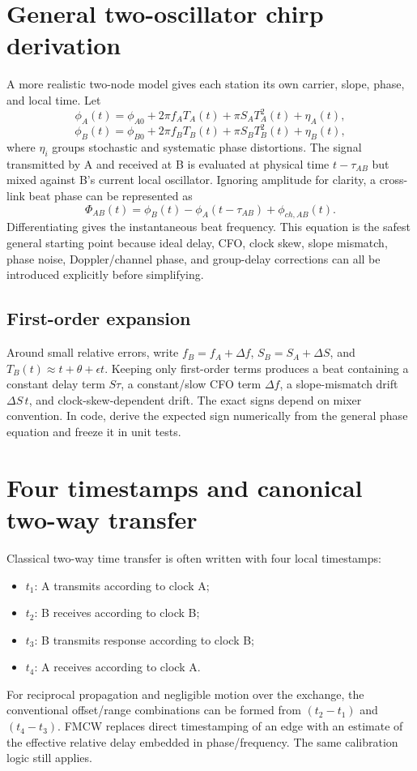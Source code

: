 \documentclass[11pt]{article}
\begin{document}
\clearpage
\section{General two-oscillator chirp derivation}
A more realistic two-node model gives each station its own carrier, slope, phase, and local time. Let
\[
\phi_A(t)=\phi_{A0}+2\pi f_A T_A(t)+\pi S_A T_A^2(t)+\eta_A(t),
\]
\[
\phi_B(t)=\phi_{B0}+2\pi f_B T_B(t)+\pi S_B T_B^2(t)+\eta_B(t),
\]
where $\eta_i$ groups stochastic and systematic phase distortions. The signal transmitted by A and received at B is evaluated at physical time $t-\tau_{AB}$ but mixed against B's current local oscillator. Ignoring amplitude for clarity, a cross-link beat phase can be represented as
\[
\Phi_{AB}(t)=\phi_B(t)-\phi_A(t-\tau_{AB})+\phi_{ch,AB}(t).
\]
Differentiating gives the instantaneous beat frequency. This equation is the safest general starting point because ideal delay, CFO, clock skew, slope mismatch, phase noise, Doppler/channel phase, and group-delay corrections can all be introduced explicitly before simplifying.

\subsection{First-order expansion}
Around small relative errors, write $f_B=f_A+\Delta f$, $S_B=S_A+\Delta S$, and $T_B(t)\approx t+\theta+\epsilon t$. Keeping only first-order terms produces a beat containing a constant delay term $S\tau$, a constant/slow CFO term $\Delta f$, a slope-mismatch drift $\Delta S\,t$, and clock-skew-dependent drift. The exact signs depend on mixer convention. In code, derive the expected sign numerically from the general phase equation and freeze it in unit tests.

\section{Four timestamps and canonical two-way transfer}
Classical two-way time transfer is often written with four local timestamps:
\begin{itemize}
\item $t_1$: A transmits according to clock A;
\item $t_2$: B receives according to clock B;
\item $t_3$: B transmits response according to clock B;
\item $t_4$: A receives according to clock A.
\end{itemize}
For reciprocal propagation and negligible motion over the exchange, the conventional offset/range combinations can be formed from $(t_2-t_1)$ and $(t_4-t_3)$. FMCW replaces direct timestamping of an edge with an estimate of the effective relative delay embedded in phase/frequency. The same calibration logic still applies.
\end{document}
